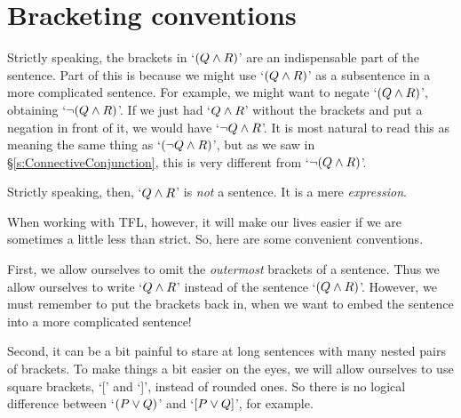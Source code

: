 %
%
%
%





\section{Bracketing conventions}
\label{TFLconventions}
Strictly speaking, the brackets in `$(Q \wedge R)$' are an indispensable part of the sentence. Part of this is because we might use `$(Q \wedge R)$' as a subsentence in a more complicated sentence. For example, we might want to negate `$(Q \wedge R)$', obtaining `$\neg(Q \wedge R)$'. If we just had `$Q \wedge R$' without the brackets and put a negation in front of it, we would have `$\neg Q \wedge R$'. It is most natural to read this as meaning the same thing as `$(\neg Q \wedge R)$', but as we saw in  \S\ref{s:ConnectiveConjunction}, this is very different from `$\neg(Q\wedge R)$'.

Strictly speaking, then, `$Q \wedge R$' is \emph{not} a sentence. It is a mere \emph{expression}.

When working with TFL, however, it will make our lives easier if we are sometimes a little less than strict. So, here are some convenient conventions.

First,  we allow ourselves to omit the \emph{outermost} brackets of a sentence. Thus we allow ourselves to write `$Q \wedge R$' instead of the sentence `$(Q \wedge R)$'. However, we must remember to put the brackets back in, when we want to embed the sentence into a more complicated sentence!

Second, it can be a bit painful to stare at long sentences with many nested pairs of brackets. To make things a bit easier on the eyes, we will allow ourselves to use square brackets, `[' and `]', instead of rounded ones. So there is no logical difference between `$(P\vee Q)$' and `$[P\vee Q]$', for example. 

